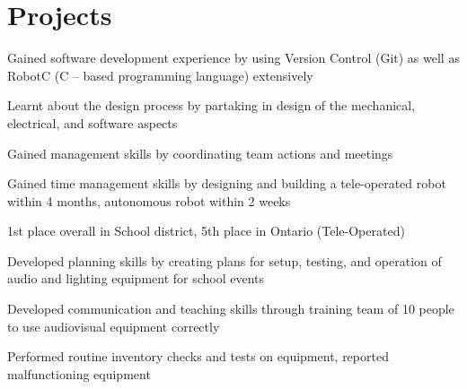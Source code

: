 \documentclass[]{resume-openfont}
\begin{document}
\begin{minipage}[t]{0.66\textwidth}
\section {Projects}
\begin{tightemize}
\item Gained software development experience by using Version Control (Git) as well as RobotC (C – based programming language) extensively 
\item Learnt about the design process by partaking in design of the mechanical, electrical, and software aspects 
\item Gained management skills by coordinating team actions and meetings \item Gained time management skills by designing and building a tele-operated robot within 4 months, autonomous robot within 2 weeks 
\item 1st place overall in School district, 5th place in Ontario (Tele-Operated) 
\end{tightemize}
\sectionsep

\begin{tightemize}
\item Developed planning skills by creating plans for setup, testing, and operation of audio and lighting equipment for school events 
\item Developed communication and teaching skills through training team of 10 people to use audiovisual equipment correctly 
\item Performed routine inventory checks and tests on equipment, reported malfunctioning equipment
\end{tightemize}
\sectionsep


\sectionsep 
\end{minipage} 
\end{document}
